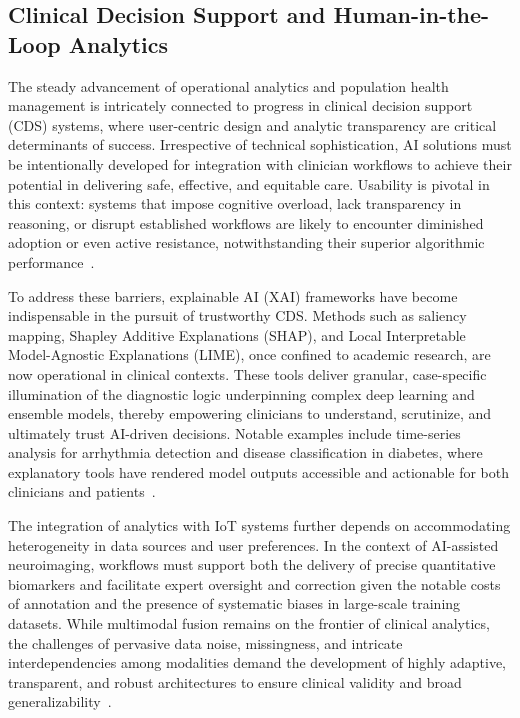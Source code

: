 \documentclass[sigconf]{acmart}
\begin{document}
\subsection{Clinical Decision Support and Human-in-the-Loop Analytics}

The steady advancement of operational analytics and population health management is intricately connected to progress in clinical decision support (CDS) systems, where user-centric design and analytic transparency are critical determinants of success. Irrespective of technical sophistication, AI solutions must be intentionally developed for integration with clinician workflows to achieve their potential in delivering safe, effective, and equitable care. Usability is pivotal in this context: systems that impose cognitive overload, lack transparency in reasoning, or disrupt established workflows are likely to encounter diminished adoption or even active resistance, notwithstanding their superior algorithmic performance~\cite{ref89,ref99}.

To address these barriers, explainable AI (XAI) frameworks have become indispensable in the pursuit of trustworthy CDS. Methods such as saliency mapping, Shapley Additive Explanations (SHAP), and Local Interpretable Model-Agnostic Explanations (LIME), once confined to academic research, are now operational in clinical contexts. These tools deliver granular, case-specific illumination of the diagnostic logic underpinning complex deep learning and ensemble models, thereby empowering clinicians to understand, scrutinize, and ultimately trust AI-driven decisions. Notable examples include time-series analysis for arrhythmia detection and disease classification in diabetes, where explanatory tools have rendered model outputs accessible and actionable for both clinicians and patients~\cite{ref87,ref90}.

The integration of analytics with IoT systems further depends on accommodating heterogeneity in data sources and user preferences. In the context of AI-assisted neuroimaging, workflows must support both the delivery of precise quantitative biomarkers and facilitate expert oversight and correction given the notable costs of annotation and the presence of systematic biases in large-scale training datasets. While multimodal fusion remains on the frontier of clinical analytics, the challenges of pervasive data noise, missingness, and intricate interdependencies among modalities demand the development of highly adaptive, transparent, and robust architectures to ensure clinical validity and broad generalizability~\cite{ref78,ref90}.
\end{document}
